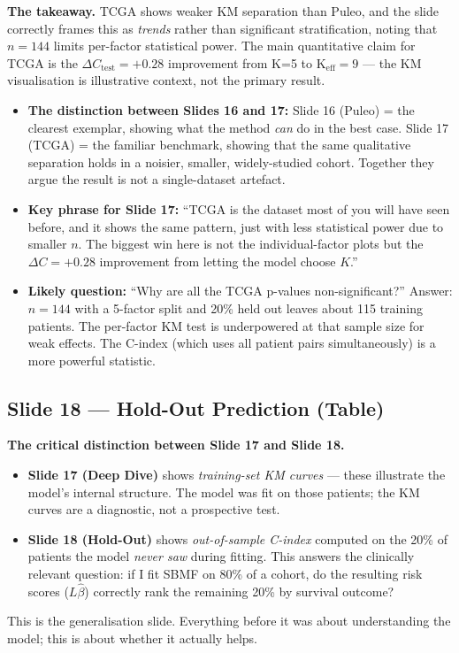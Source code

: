\documentclass[11pt]{article}
\newcommand{\sectionlabel}[1]{\textbf{#1}}
\begin{document}
\textbf{The takeaway.} TCGA shows weaker KM separation than Puleo, and the slide correctly frames this as \emph{trends} rather than significant stratification, noting that $n = 144$ limits per-factor statistical power. The main quantitative claim for TCGA is the $\Delta C_\text{test} = +0.28$ improvement from K=5 to K$_\text{eff} = 9$ --- the KM visualisation is illustrative context, not the primary result.

\begin{itemize}
  \item \sectionlabel{The distinction between Slides 16 and 17:} Slide 16 (Puleo) = the clearest exemplar, showing what the method \emph{can} do in the best case. Slide 17 (TCGA) = the familiar benchmark, showing that the same qualitative separation holds in a noisier, smaller, widely-studied cohort. Together they argue the result is not a single-dataset artefact.
  \item \sectionlabel{Key phrase for Slide 17:} ``TCGA is the dataset most of you will have seen before, and it shows the same pattern, just with less statistical power due to smaller $n$. The biggest win here is not the individual-factor plots but the $\Delta C = +0.28$ improvement from letting the model choose $K$.''
  \item \sectionlabel{Likely question:} ``Why are all the TCGA p-values non-significant?'' Answer: $n = 144$ with a 5-factor split and 20\% held out leaves about 115 training patients. The per-factor KM test is underpowered at that sample size for weak effects. The C-index (which uses all patient pairs simultaneously) is a more powerful statistic.
\end{itemize}

\subsection*{Slide 18 --- Hold-Out Prediction (Table)}

\noindent\textbf{The critical distinction between Slide 17 and Slide 18.}
\begin{itemize}
  \item \textbf{Slide 17 (Deep Dive)} shows \emph{training-set KM curves} --- these illustrate the model's internal structure. The model was fit on those patients; the KM curves are a diagnostic, not a prospective test.
  \item \textbf{Slide 18 (Hold-Out)} shows \emph{out-of-sample C-index} computed on the 20\% of patients the model \emph{never saw} during fitting. This answers the clinically relevant question: if I fit SBMF on 80\% of a cohort, do the resulting risk scores ($L\hat{\beta}$) correctly rank the remaining 20\% by survival outcome?
\end{itemize}
This is the generalisation slide. Everything before it was about understanding the model; this is about whether it actually helps.
\end{document}
